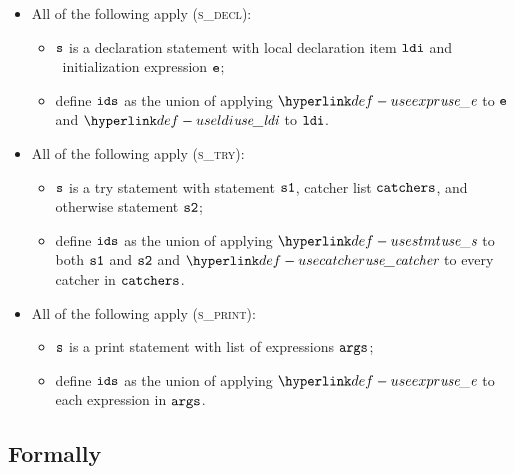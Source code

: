 \begin{itemize}
  \item All of the following apply (\textsc{s\_decl}):
  \begin{itemize}
    \item $\vs$ is a declaration statement with local declaration item $\ldi$ and \optional\ initialization expression $\ve$;
    \item define $\ids$ as the union of applying $\useexpr$ to $\ve$ and $\useldi$ to $\ldi$.
  \end{itemize}

  \item All of the following apply (\textsc{s\_try}):
  \begin{itemize}
    \item $\vs$ is a try statement with statement $\vsone$, catcher list $\catchers$, and otherwise statement $\vstwo$;
    \item define $\ids$ as the union of applying $\usestmt$ to both $\vsone$ and $\vstwo$ and $\usecatcher$ to
          every catcher in $\catchers$.
  \end{itemize}

  \item All of the following apply (\textsc{s\_print}):
  \begin{itemize}
    \item $\vs$ is a print statement with list of expressions $\vargs$;
    \item define $\ids$ as the union of applying $\useexpr$ to each expression in $\vargs$.
  \end{itemize}
\end{itemize}

\subsection{Formally}
\begin{mathpar}
\end{mathpar}



